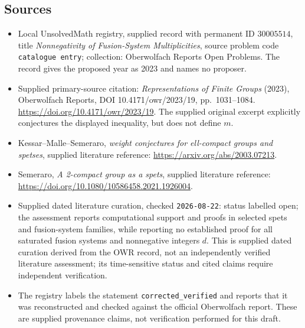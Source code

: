 \documentclass[11pt]{article}
\begin{document}
\subsection{Sources}
\begin{itemize}
\item Local UnsolvedMath registry, supplied record with permanent ID \(30005514\), title \emph{Nonnegativity of Fusion-System Multiplicities}, source problem code \texttt{catalogue entry}; collection: Oberwolfach Reports Open Problems. The record gives the proposed year as 2023 and names no proposer.
\item Supplied primary-source citation: \emph{Representations of Finite Groups} (2023), Oberwolfach Reports, DOI 10.4171/owr/2023/19, pp.\ 1031--1084. \url{https://doi.org/10.4171/owr/2023/19}. The supplied original excerpt explicitly conjectures the displayed inequality, but does not define \(m\).
\item Kessar--Malle--Semeraro, \emph{weight conjectures for ell-compact groups and spetses}, supplied literature reference: \url{https://arxiv.org/abs/2003.07213}.
\item Semeraro, \emph{A 2-compact group as a spets}, supplied literature reference: \url{https://doi.org/10.1080/10586458.2021.1926004}.
\item Supplied dated literature curation, checked \texttt{2026-08-22}: status labelled open; the assessment reports computational support and proofs in selected spets and fusion-system families, while reporting no established proof for all saturated fusion systems and nonnegative integers \(d\). This is supplied dated curation derived from the OWR record, not an independently verified literature assessment; its time-sensitive status and cited claims require independent verification.
\item The registry labels the statement \texttt{corrected\_verified} and reports that it was reconstructed and checked against the official Oberwolfach report. These are supplied provenance claims, not verification performed for this draft.
\end{itemize}
\end{document}
